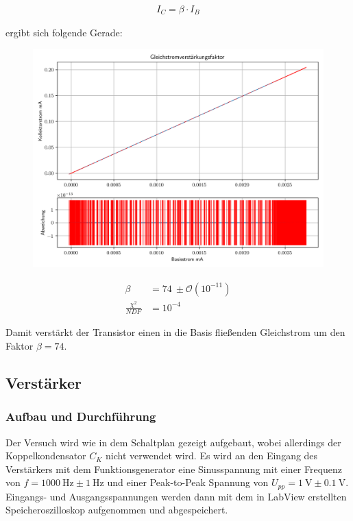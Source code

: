 \documentclass[12pt,twoside,a4paper]{scrartcl}
\begin{document}
        \begin{align*}
            I_C = \beta \cdot I_B
        \end{align*}

        ergibt sich folgende Gerade:

        \begin{figure}[H]
            \begin{minipage}{0.69 \textwidth}
                \includegraphics[width = 0.8 \textwidth]{Plots/Transistor/gsvf}
            \end{minipage}
            \begin{minipage}{0.29 \textwidth}
                \begin{align*}
                    \beta &= \SI{74}{} \pm \mathcal{O}(10^{-11}) \\
                    \frac{\chi^2}{NDF} &= 10^{-4}
                \end{align*}
            \end{minipage}
        \end{figure}

				Damit verstärkt der Transistor einen in die Basis fließenden Gleichstrom um den Faktor $\beta = 74$.

    \subsection{Verstärker}

			\subsubsection{Aufbau und Durchführung}

			Der Versuch wird wie in dem Schaltplan gezeigt aufgebaut, wobei allerdings der Koppelkondensator $C_K$ nicht verwendet wird.
			Es wird an den Eingang des Verstärkers mit dem Funktionsgenerator eine Sinusspannung mit einer Frequenz von $f = \SI{1000}{\hertz} \pm \SI{1}{\hertz}$
		  und einer Peak-to-Peak Spannung von $U_{pp} = \SI{1}{\volt} \pm \SI{0.1}{\volt}$.
			Eingangs- und Ausgangsspannungen werden dann mit dem in LabView erstellten Speicheroszilloskop aufgenommen und abgespeichert.
\end{document}

